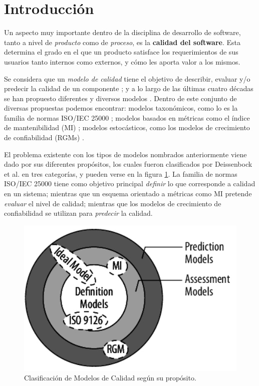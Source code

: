 \section{Introducción}

Un aspecto muy importante dentro de la disciplina de desarrollo de software, tanto
a nivel de \textit{producto} como de \textit{proceso}, es la \textbf{calidad del
software}.
Esta determina el grado en el que un producto satisface los requerimientos de sus usuarios
tanto internos como externos, y cómo les aporta valor a los mismos.

Se considera que un \textit{modelo de calidad} tiene el objetivo de describir, evaluar y/o
predecir la calidad de un componente \cite{Wagner2013}; y a lo largo de las últimas cuatro
décadas se han propuesto diferentes y diversos modelos \cite{Deissenboeck2009}.
Dentro de este conjunto de diversas propuestas podemos encontrar: modelos taxonómicos, como
lo es la familia de normas ISO/IEC 25000 \cite{ref}; modelos basados en métricas como el
índice de mantenibilidad (MI) \cite{ref}; modelos estocásticos, como los modelos de crecimiento
de confiabilidad (RGMs) \cite{ref}.

El problema existente con los tipos de modelos nombrados anteriormente viene dado por sus
diferentes propósitos, los cuales fueron clasificados por Deissenbock et al. \cite{Deissenboeck2009}
en tres categorías, y pueden verse en la figura \ref{DAPModels}.
La familia de normas ISO/IEC 25000 tiene como objetivo principal \textit{definir} lo que
corresponde a calidad en un sistema; mientras que un esquema orientado a métricas como MI
pretende \textit{evaluar} el nivel de calidad; mientras que los modelos de crecimiento de
confiabilidad se utilizan para \textit{predecir} la calidad.

\begin{figure}
    \label{DAPModels}
    \includegraphics[width=12cm]{quality_metrics/dap_models.png}
    \centering
    \caption{Clasificación de Modelos de Calidad según su propósito.}
\end{figure}

